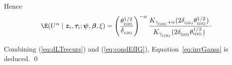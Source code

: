 Hence \cite[Section A.3.6]{Hougaard00}
\begin{equation} \label{eq:condEfIG}
  \E ( U^{\alpha} \mid \bm{z}_{i}, \bm{\tau}_i; \bm{\psi}, \bm{\beta}, \xi ) = 
    \left( \frac{\theta^{1 \slash 2}_{_{\textrm{GIG}}}}{\delta_{_{\textrm{GIG}}}} \right)^{- \alpha}
    \frac{K_{\gamma_{_{\textrm{GIG}}} + \alpha} ( 2 \delta_{_{\textrm{GIG}}} \theta^{1 \slash 2 }_{_{\textrm{GIG}}} )}
          {K_{\gamma_{_{\textrm{GIG}}}} ( 2 \delta_{_{\textrm{GIG}}} \theta^{1 \slash 2 }_{_{\textrm{GIG}}} )}
    \cdot
\end{equation}

Combining (\ref{eq:dLTrecurs}) and (\ref{eq:condEfIG}), Equation~\ref{eq:invGauss} is deduced.
\qed

